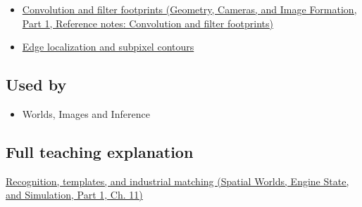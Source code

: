\begin{itemize}
\tightlist
\item
  \href{../03-Geometry-Cameras-and-Image-Formation-P01/main.pdf\#appendix-d5b3c692d9f0}{Convolution and filter footprints (Geometry, Cameras, and Image Formation, Part 1, Reference notes: Convolution and filter footprints)}
\item
  \hyperref[appendix-36022286b03e]{Edge localization and subpixel contours}
\end{itemize}

\subsection{Used by}\label{appendix-5fb4af80d1c7-used-by}

\hypertarget{appendix-5fb4af80d1c7-used-by}{}

\begin{itemize}
\tightlist
\item
  {Worlds, Images and Inference}
\end{itemize}

\subsection{Full teaching explanation}\label{appendix-5fb4af80d1c7-full-teaching-explanation}

\hypertarget{appendix-5fb4af80d1c7-full-teaching-explanation}{}

\href{../05-Spatial-Worlds-Engine-State-and-Simulation-P01/main.pdf\#04-visual-computing-ii-ch030-recognition-templates-and-industrial-matching}{Recognition, templates, and industrial matching (Spatial Worlds, Engine State, and Simulation, Part 1, Ch. 11)}
